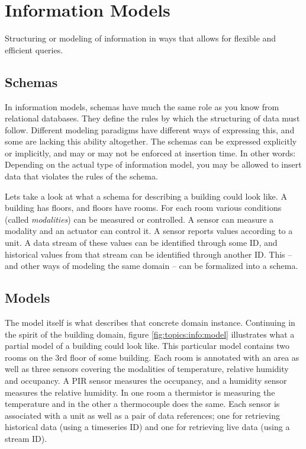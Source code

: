

\section{Information Models}

Structuring or modeling of information in ways that allows for flexible and efficient queries.

\subsection{Schemas}

In information models, schemas have much the same role as you know from relational databases. They define the rules by which the structuring of data must follow. Different modeling paradigms have different ways of expressing this, and some are lacking this ability altogether. The schemas can be expressed explicitly or implicitly, and may or may not be enforced at insertion time. In other words: Depending on the actual type of information model, you may be allowed to insert data that violates the rules of the schema.

Lets take a look at what a schema for describing a building could look like. A building has floors, and floors have rooms. For each room various conditions (called \textsl{modalities}) can be measured or controlled. A sensor can measure a modality and an actuator can control it. A sensor reports values according to a unit. A data stream of these values can be identified through some ID, and historical values from that stream can be identified through another ID. This -- and other ways of modeling the same domain -- can be formalized into a schema.

\subsection{Models}

The model itself is what describes that concrete domain instance. Continuing in the spirit of the building domain, figure \ref{fig:topics:info:model} illustrates what a partial model of a building could look like. This particular model contains two rooms on the 3rd floor of some building. Each room is annotated with an area as well as three sensors covering the modalities of temperature, relative humidity and occupancy. A PIR sensor measures the occupancy, and a humidity sensor measures the relative humidity. In one room a thermistor is measuring the temperature and in the other a thermocouple does the same. Each sensor is associated with a unit as well as a pair of data references; one for retrieving historical data (using a timeseries ID) and one for retrieving live data (using a stream ID).

